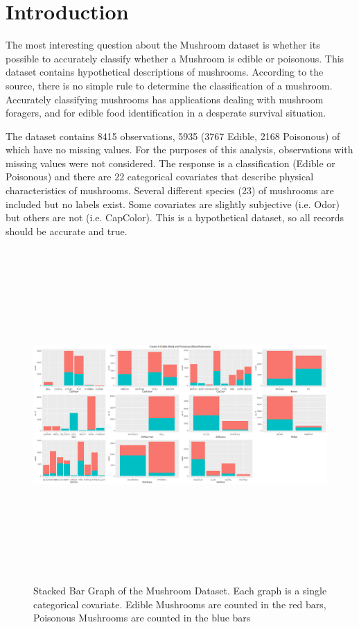 \documentclass[float=false, crop=false]{standalone}
\begin{document}
\section*{Introduction}

The most interesting question about the Mushroom dataset \cite{UCI} is whether its possible to accurately classify whether a Mushroom is edible or poisonous. This dataset contains hypothetical descriptions of mushrooms. According to the source, there is no simple rule to determine the classification of a mushroom.   Accurately classifying mushrooms has applications dealing with mushroom foragers, and for edible food identification in a desperate survival situation.

The dataset contains 8415 observations, 5935 (3767 Edible, 2168 Poisonous) of which have no missing values. For the purposes of this analysis, observations with missing values were not considered. The response is a classification (Edible or Poisonous) and there are 22 categorical covariates that describe physical characteristics of mushrooms. Several different species (23) of mushrooms are included but no labels exist. Some covariates are slightly subjective (i.e. Odor) but others are not (i.e. CapColor). This is a hypothetical dataset, so all records should be accurate and true. 

\begin{figure}[H] 
		\includegraphics[width=\textwidth, height=5in]{images/stackedbar1.png}
		\caption{Stacked Bar Graph of the Mushroom Dataset. Each graph is a single categorical covariate. Edible Mushrooms are counted in the red bars, Poisonous Mushrooms are counted in the blue bars}
		\label{fig: sbar1}
\end{figure}
\end{document}
